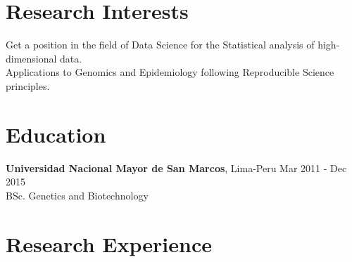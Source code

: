 \documentclass[margin,line]{res}
\begin{document}
\address{Calle Tambo Huascar 201, San Miguel, Lima-Peru}
\address{\textit{contact:} avallecam@gmail.com or (+51)950951722}

\begin{resume}

\vspace*{.15in}

\section{\sc Research Interests}

Get a position in the field of Data Science for the Statistical analysis of high-dimensional data.\\
Applications to Genomics and Epidemiology following Reproducible Science principles.\\ 





\section{\sc Education}
{\bf Universidad Nacional Mayor de San Marcos}, Lima-Peru \hfill Mar 2011 - Dec 2015\\
BSc. Genetics and Biotechnology\\

\section{\sc Research Experience}


\end{resume}
\end{document}
